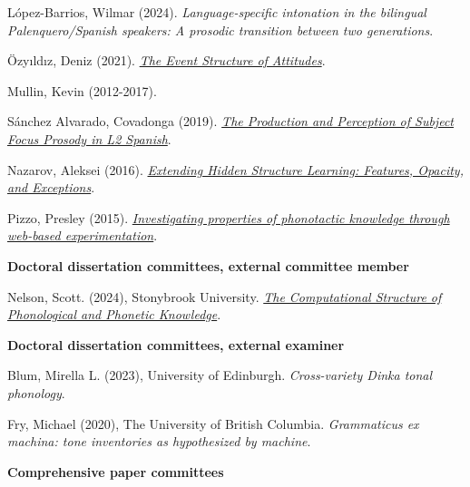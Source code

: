 \documentclass[10pt]{article}
\newcommand{\halfblankline}{\quad\vspace{-0.5\baselineskip}\pagebreak[3]}
\begin{document}
\begin{innerlist}
\item L{\'o}pez-Barrios, Wilmar (2024). \emph{Language-specific intonation in the bilingual Palenquero/Spanish speakers: A prosodic transition between two generations}.
    \item \"{O}zy\i{}ld\i{}z, Deniz (2021). \href{https://scholarworks.umass.edu/dissertations_2/2209/}{\emph{The Event Structure of Attitudes}}.
    \item Mullin, Kevin (2012-2017).
    \item S\'anchez Alvarado, Covadonga (2019). \href{https://scholarworks.umass.edu/dissertations_2/1866/}{\emph{The Production and Perception of Subject Focus Prosody in L2 Spanish}}.
    \item Nazarov, Aleksei (2016). \href{https://scholarworks.umass.edu/dissertations_2/782/}{\emph{Extending Hidden Structure Learning: Features, Opacity, and Exceptions}}.
    \item Pizzo, Presley (2015). \href{https://scholarworks.umass.edu/dissertations_2/502/}{\emph{Investigating properties of
        phonotactic knowledge through web-based experimentation}}.
\end{innerlist}

\halfblankline


\textbf{Doctoral dissertation committees, external committee member} \hfill

\begin{innerlist}
    \item Nelson, Scott. (2024), Stonybrook University.  \href{https://www.jeffreyheinz.net/advisees/2024_ScottNelson_dissertation.pdf}{\emph{The Computational Structure of Phonological and Phonetic Knowledge}}.
\end{innerlist}


\textbf{Doctoral dissertation committees, external examiner} \hfill

\begin{innerlist}
    \item Blum, Mirella L. (2023), University of Edinburgh.  \emph{Cross-variety Dinka tonal phonology}.
    \item Fry, Michael (2020), The University of British Columbia. \emph{Grammaticus ex machina: tone inventories as hypothesized by machine}.
\end{innerlist}


\halfblankline


\textbf{Comprehensive paper committees} \hfill
\end{document}
